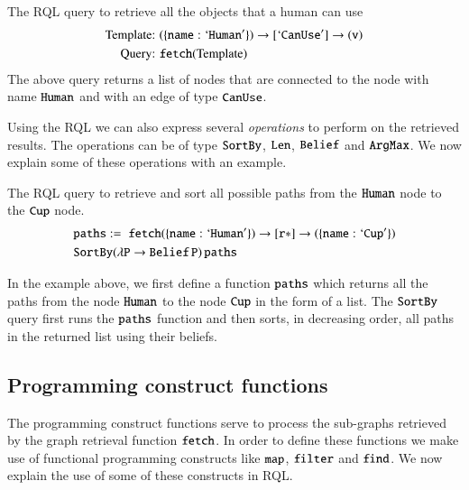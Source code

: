 \begin{example}
The RQL query to retrieve all the objects that a human can use
\begin{align*}
\text{Template: }&{\tt(\{name:`Human'\})\rightarrow [`CanUse'] \rightarrow (v)}\\
\text{Query: }&{\tt fetch}(\text{Template})
\end{align*}
The above query returns a list of nodes that are connected to the node with name ${\tt{Human}}$ and with an edge of type ${\tt{CanUse}}$.%
\end{example}
Using the RQL  we can also express several \textit{operations} to perform on the retrieved results.
The operations can be of type   ${\tt SortBy}$, ${\tt Len}$, ${\tt Belief}$ and ${\tt ArgMax}$. We now
explain some of these operations with an example.
\begin{example}
The RQL query to retrieve and sort all possible paths from the ${\tt{Human}}$ node to the ${\tt{Cup}}$ node.
\vskip -0.13in
{\small
\begin{align*}
 &{\tt paths }:= \;{\tt fetch (\{name:`Human'\})\rightarrow [r *] \rightarrow (\{name:`Cup'\})}\\
& {\tt SortBy(\lambda P \rightarrow Belief \, P) \, paths} \\
\end{align*}
}\vskip -0.15in

In the example above, we first define a function ${\tt paths}$ which returns all  the paths from the node ${\tt Human }$ to the node ${\tt Cup }$ in the form of a list. The ${\tt SortBy}$ query first runs the ${\tt paths}$ function and then sorts, in decreasing order, all paths in the returned list using their beliefs.
\end{example}


\subsection{Programming construct functions}
The programming construct functions serve to process the sub-graphs retrieved by the graph retrieval function ${\tt fetch}$. In order to define these functions we make use of functional programming constructs like ${\tt map}$, ${\tt filter}$ and ${\tt find}$. We now explain the use of some of these constructs in RQL.

